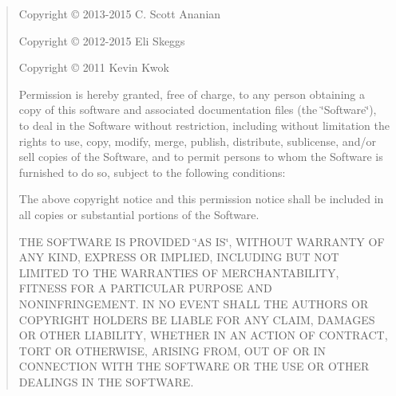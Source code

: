 \begin{quote}
Copyright \copyright{} 2013-\/2015 C. Scott Ananian

Copyright \copyright{} 2012-\/2015 Eli Skeggs

Copyright \copyright{} 2011 Kevin Kwok

Permission is hereby granted, free of charge, to any person obtaining a copy of this software and associated documentation files (the \char`\"{}\+Software\char`\"{}), to deal in the Software without restriction, including without limitation the rights to use, copy, modify, merge, publish, distribute, sublicense, and/or sell copies of the Software, and to permit persons to whom the Software is furnished to do so, subject to the following conditions\+:

The above copyright notice and this permission notice shall be included in all copies or substantial portions of the Software.

T\+HE S\+O\+F\+T\+W\+A\+RE IS P\+R\+O\+V\+I\+D\+ED \char`\"{}\+A\+S I\+S\char`\"{}, W\+I\+T\+H\+O\+UT W\+A\+R\+R\+A\+N\+TY OF A\+NY K\+I\+ND, E\+X\+P\+R\+E\+SS OR I\+M\+P\+L\+I\+ED, I\+N\+C\+L\+U\+D\+I\+NG B\+UT N\+OT L\+I\+M\+I\+T\+ED TO T\+HE W\+A\+R\+R\+A\+N\+T\+I\+ES OF M\+E\+R\+C\+H\+A\+N\+T\+A\+B\+I\+L\+I\+TY, F\+I\+T\+N\+E\+SS F\+OR A P\+A\+R\+T\+I\+C\+U\+L\+AR P\+U\+R\+P\+O\+SE A\+ND N\+O\+N\+I\+N\+F\+R\+I\+N\+G\+E\+M\+E\+NT. IN NO E\+V\+E\+NT S\+H\+A\+LL T\+HE A\+U\+T\+H\+O\+RS OR C\+O\+P\+Y\+R\+I\+G\+HT H\+O\+L\+D\+E\+RS BE L\+I\+A\+B\+LE F\+OR A\+NY C\+L\+A\+IM, D\+A\+M\+A\+G\+ES OR O\+T\+H\+ER L\+I\+A\+B\+I\+L\+I\+TY, W\+H\+E\+T\+H\+ER IN AN A\+C\+T\+I\+ON OF C\+O\+N\+T\+R\+A\+CT, T\+O\+RT OR O\+T\+H\+E\+R\+W\+I\+SE, A\+R\+I\+S\+I\+NG F\+R\+OM, O\+UT OF OR IN C\+O\+N\+N\+E\+C\+T\+I\+ON W\+I\+TH T\+HE S\+O\+F\+T\+W\+A\+RE OR T\+HE U\+SE OR O\+T\+H\+ER D\+E\+A\+L\+I\+N\+GS IN T\+HE S\+O\+F\+T\+W\+A\+RE. \end{quote}
